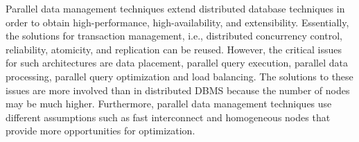 \documentclass{vldb}
\begin{document}
Parallel data management techniques extend distributed database techniques in order to obtain high-performance, high-availability, and extensibility. Essentially, the solutions for transaction management, i.e., distributed concurrency control, reliability, atomicity, and replication can be reused. However, the critical issues for such architectures are data placement, parallel query execution, parallel data processing, parallel query optimization and load balancing. The solutions to these issues are more involved than in distributed DBMS because the number of nodes may be much higher. Furthermore, parallel data management techniques use different assumptions such as fast interconnect and homogeneous nodes that provide more opportunities for optimization.



\end{document}
